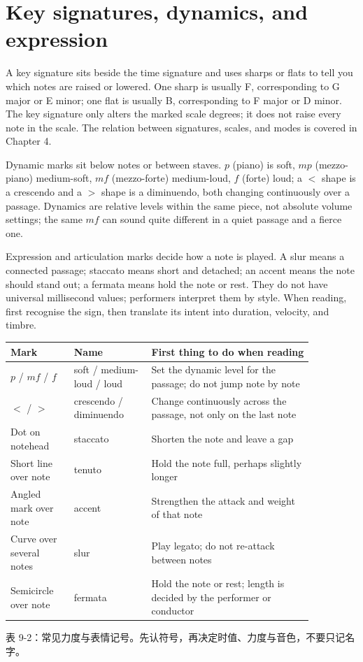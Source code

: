 \section{Key signatures, dynamics, and expression}

A key signature sits beside the time signature and uses sharps or flats to tell you which notes are raised or lowered. One sharp is usually F\sharpsym, corresponding to G major or E minor; one flat is usually B\flatsym, corresponding to F major or D minor. The key signature only alters the marked scale degrees; it does not raise every note in the scale. The relation between signatures, scales, and modes is covered in Chapter 4.

Dynamic marks sit below notes or between staves. $p$ (piano) is soft, $mp$ (mezzo-piano) medium-soft, $mf$ (mezzo-forte) medium-loud, $f$ (forte) loud; a $<$ shape is a crescendo and a $>$ shape is a diminuendo, both changing continuously over a passage. Dynamics are relative levels within the same piece, not absolute volume settings; the same $mf$ can sound quite different in a quiet passage and a fierce one.

Expression and articulation marks decide how a note is played. A slur means a connected passage; staccato means short and detached; an accent means the note should stand out; a fermata means hold the note or rest. They do not have universal millisecond values; performers interpret them by style. When reading, first recognise the sign, then translate its intent into duration, velocity, and timbre.

\begin{center}
\small
\begin{tabular}{p{0.18\linewidth}p{0.22\linewidth}p{0.46\linewidth}}
\toprule
Mark & Name & First thing to do when reading \\
\midrule
$p$ / $mf$ / $f$ & soft / medium-loud / loud & Set the dynamic level for the passage; do not jump note by note \\
$<$ / $>$ & crescendo / diminuendo & Change continuously across the passage, not only on the last note \\
Dot on notehead & staccato & Shorten the note and leave a gap \\
Short line over note & tenuto & Hold the note full, perhaps slightly longer \\
Angled mark over note & accent & Strengthen the attack and weight of that note \\
Curve over several notes & slur & Play legato; do not re-attack between notes \\
Semicircle over note & fermata & Hold the note or rest; length is decided by the performer or conductor \\
\bottomrule
\end{tabular}

表 9-2：常见力度与表情记号。先认符号，再决定时值、力度与音色，不要只记名字。
\end{center}

